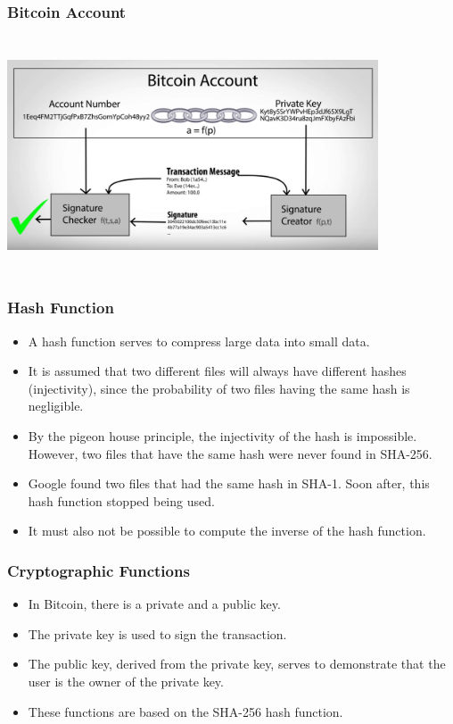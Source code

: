 \documentclass{beamer}
\begin{document}
\begin{frame}
  \frametitle{Bitcoin Account}
    \includegraphics[width=11cm, height=7cm]{privatekey}
\end{frame}

\begin{frame}
  \frametitle{Hash Function}
  \begin{itemize}
    \item A hash function serves to compress large data into small data.
    \item It is assumed that two different files will always have different hashes (injectivity),
      since the probability of two files having the same hash is negligible.
    \item By the pigeon house principle, the injectivity of the hash is impossible.
      However, two files that have the same hash were never found in SHA-256.
    \item Google found two files that had the same hash in SHA-1.
      Soon after, this hash function stopped being used.
    \item It must also not be possible to compute the inverse of the hash function.
  \end{itemize}
\end{frame}

\begin{frame}
  \frametitle{Cryptographic Functions}
  \begin{itemize}
    \item In Bitcoin, there is a private and a public key.
    \item The private key is used to sign the transaction.
    \item The public key, derived from the private key,
      serves to demonstrate that the user is the owner of the private key.
    \item These functions are based on the SHA-256 hash function.
  \end{itemize}
\end{frame}
\end{document}

